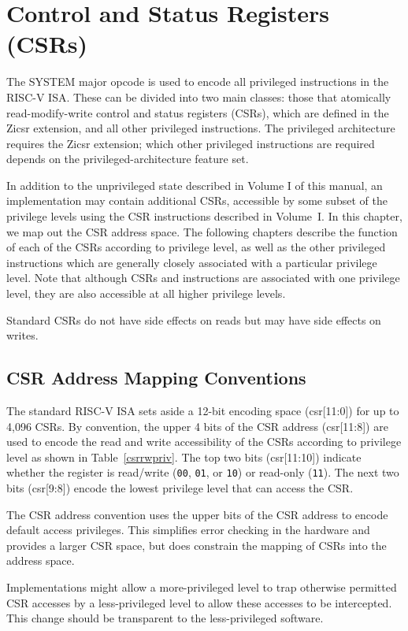 \chapter{Control and Status Registers (CSRs)}
\label{chap:priv-csrs}

The SYSTEM major opcode is used to encode all privileged instructions
in the RISC-V ISA.
These can be divided into two main classes: those that atomically
read-modify-write control and status registers (CSRs), which are defined in
the Zicsr extension, and all other privileged instructions.
The privileged architecture requires the Zicsr extension; which other
privileged instructions are required depends on the privileged-architecture
feature set.

In addition to the unprivileged
state described in Volume I of this manual, an implementation may
contain additional CSRs, accessible by some subset of the privilege
levels using the CSR instructions described in Volume~I.
In this chapter, we map out the CSR address space.  The following
chapters describe the function of each of the CSRs according to
privilege level, as well as the other privileged instructions which
are generally closely associated with a particular privilege level.
Note that although CSRs and instructions are associated with one
privilege level, they are also accessible at all higher privilege
levels.

Standard CSRs do not have side effects on reads but may have side effects
on writes.

\section{CSR Address Mapping Conventions}

The standard RISC-V ISA sets aside a 12-bit encoding space (csr[11:0])
for up to 4,096 CSRs.  By convention, the upper 4 bits of the CSR
address (csr[11:8]) are used to encode the read and write
accessibility of the CSRs according to privilege level as shown in
Table~\ref{csrrwpriv}.  The top two bits (csr[11:10]) indicate whether
the register is read/write ({\tt 00}, {\tt 01}, or {\tt 10}) or
read-only ({\tt 11}).  The next two bits (csr[9:8]) encode the lowest
privilege level that can access the CSR.

\begin{commentary}
The CSR address convention uses the upper bits of the CSR address to
encode default access privileges.  This simplifies error checking in
the hardware and provides a larger CSR space, but does constrain the
mapping of CSRs into the address space.

Implementations might allow a more-privileged level to trap otherwise
permitted CSR accesses by a less-privileged level to allow these
accesses to be intercepted.  This change should be transparent to the
less-privileged software.
\end{commentary}

